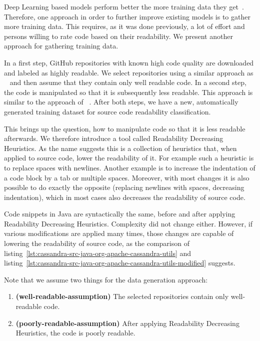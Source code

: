 \documentclass[%
class=scrreprt,
chapterprefix=false,%
open=right,%
twoside=false,%
paper=a4,%
logofile={Logo\_zentral\_farbig\_EN.png},%
thesistype=master,%
UKenglish,%
]{se2thesis}
\begin{document}
	Deep Learning based models perform better the more training data they get~\cite{hestness2017deep}. Therefore, one approach in order to further improve existing models is to gather more training data.
	This requires, as it was done previously, a lot of effort and persons willing to rate code based on their readability. We present another approach for gathering training data.
	
	In a first step, GitHub repositories with known high code quality are downloaded and labeled as highly readable. We select repositories using a similar approach as \citeauthor{allamanis2016convolutional}~\cite{allamanis2016convolutional} and then assume that they contain only well readable code.
	In a second step, the code is manipulated so that it is subsequently less readable. This approach is similar to the approach of \citeauthor{loriot2022styler}~\cite{loriot2022styler}. After both steps, we have a new, automatically generated training dataset for source code readability classification.
		
	This brings up the question, how to manipulate code so that it is less readable afterwards. We therefore introduce a tool called Readability Decreasing Heuristics. As the name suggests this is a collection of heuristics that, when applied to source code, lower the readability of it. For example such a heuristic is to replace spaces with newlines. Another example is to increase the indentation of a code block by a tab or multiple spaces. Moreover, with most changes it is also possible to do exactly the opposite (replacing newlines with spaces, decreasing indentation), which in most cases also decreases the readability of source code.
	
	Code snippets in Java are syntactically the same, before and after applying Readability Decreasing Heuristics. Complexity did not change either. However, if various modifications are applied many times, those changes are capable of lowering the readability of source code, as the comparison of listing~\ref{lst:cassandra-src-java-org-apache-cassandra-utils} and listing~\ref{lst:cassandra-src-java-org-apache-cassandra-utils-modified} suggests.
	
	Note that we assume two things for the data generation approach:
	\begin{enumerate}[label={Assumption \arabic*},ref={\arabic*},leftmargin=*]
		\item \label{well-readable-assumption} \textbf{(well-readable-assumption)} The selected repositories contain only well-readable code.
		\item \label{poorly-readable-assumption} \textbf{(poorly-readable-assumption)} After applying Readability Decreasing Heuristics, the code is poorly readable.
	\end{enumerate}
	
\end{document}
